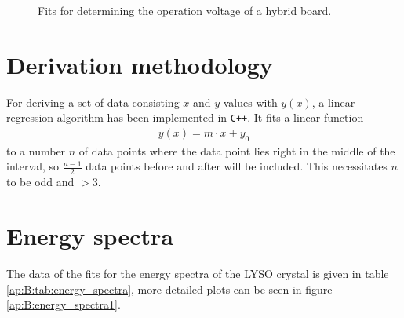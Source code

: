 \begin{figure}[H]
	\hfill
	\hfill
	\hfill
	\caption[Operation voltage fits (hyrbid)]{Fits for determining the operation voltage of a hybrid board. }
	\label{ap:B:optimal_fits_hybrid}
\end{figure}

\newpage

\section{Derivation methodology} \label{ap:B:sec:derivation}

For deriving a set of data consisting $x$ and $y$ values with $y(x)$, a linear regression algorithm has been implemented in \texttt{C++}. It fits a linear function 
\begin{align*}
y(x)=m\cdot x+y_0 
\end{align*}
to a number $n$ of data points where the data point lies right in the middle of the interval, so $\frac{n-1}{2}$ data points before and after will be included. This necessitates $n$ to be odd and $>3$.

\section{Energy spectra} \label{ap:energy_spectra}

The data of the fits for the energy spectra of the LYSO crystal is given in table \ref{ap:B:tab:energy_spectra}, more detailed plots can be seen in figure \ref{ap:B:energy_spectra1}. 

